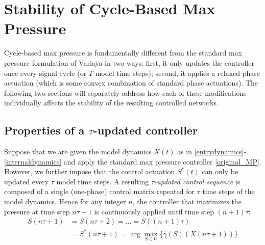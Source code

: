 \section{Stability of Cycle-Based Max Pressure}
Cycle-based max pressure is fundamentally different from the standard max pressure formulation of Variaya \cite{MaxPressureStochastic} in two ways: first, it only updates the controller once every signal cycle (or $T$ model time steps); second, it applies a relaxed phase actuation (which is some convex combination of standard phase actuations). The following two sections will separately address how each of these modifications individually affects the stability of the resulting controlled networks. 

\subsection*{Properties of a $\tau$-updated controller}
Suppose that we are given the model dynamics $X(t)$ as in \eqref{entrydynamics}-\eqref{internaldynamics} and apply the standard max pressure controller \eqref{original_MP}. However, we further impose that the control actuation $S^*(t)$ can only be updated every $\tau$ model time steps. A resulting \emph{$\tau$-updated control sequence} is composed of a single (one-phase) control matrix repeated for $\tau$ time steps of the model dynamics. Hence for any integer $n$, the controller that maximizes the pressure at time step $n\tau + 1$ is continuously applied until time step $(n + 1)\tau$:
\begin{align}  \label{CYCLE_CONTROLLER}
S(n\tau+1)  &= S(n\tau +2) = \ldots = S((n+1)\tau ) \\ \nonumber
&= S^*(n\tau +1) =  \arg\max_{S\in U} \{\gamma(S)(X(n\tau +1 ))\}  
\end{align}
%
%
%

